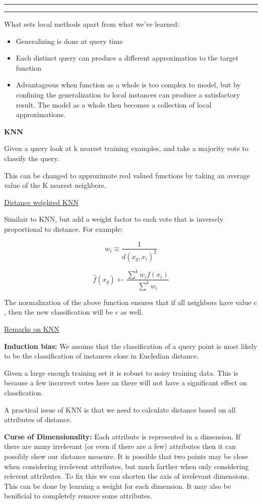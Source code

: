 \documentclass[11pt]{article}
\newcounter{questionCounter}
\newcounter{partCounter}[questionCounter]
\newenvironment{question}[2][\arabic{questionCounter}]{%
    \addtocounter{questionCounter}{1}%
    \setcounter{partCounter}{0}%
    \vspace{.25in} \hrule \vspace{0.5em}%
        \noindent{\bf #1: #2}%
    \vspace{0.8em} \hrule \vspace{.10in}%
}{}
\begin{document}
\begin{question}{Instance-Based Learning}

What sets local methods apart from what we've learned:

\begin{itemize}
    \item Generalizing is done at query time\\
    \item Each distinct query can produce a different approximation to the target function\\
    \item Advantageous when function as a whole is too complex to model, but by confining
            the generalization to local instances can produce a satisfactory result. The
            model as a whole then becomes a collection of local approximations.
\end{itemize}

\textbf{KNN}

Given a query look at k nearest training examples, and take a majority vote to classify the query.

This can be changed to approximate real valued functions by taking an average value of
the K nearest neighbors.

\underline{Distance weighted KNN}

Similair to KNN, but add a weight factor to each vote that is inversely proportional
to distance. For example:

$$w_i \equiv \frac{1}{d(x_q, x_i)^2}$$

$$ \hat{f}(x_q) \leftarrow \frac{\sum^kw_if(x_i)}{\sum^k{w_i}}$$

The normalization of the above function ensures that if all neighbors
have value $c$, then the new classification will be $c$ as well.

\underline{Remarks on KNN}

\textbf{Induction bias:} We assume that the classification of a query point
is most likely to be the classification of instances close in
Eucledian distance.

Given a large enough training set it is robust to noisy training data.
This is because a few incorrect votes here an there will not have
a significant effect on classfication.

A practical issue of KNN is that we need to calculate distance based on
all attributes of distance.

\textbf{Curse of Dimensionality:} Each attribute is represented in a dimension. If there
are many irrelevant (or even if there are a few) attributes then it can possibly
skew our distance measure. It is possible that two points may be close when 
considering irrelevent attributes, but much farther when only considering
relevent attributes. To fix this we can shorten the axis of irrelevant dimensions.
This can be done by learning a weight for each dimension. It may also be benificial
to completely remove some attributes.



\end{question}
\end{document}
